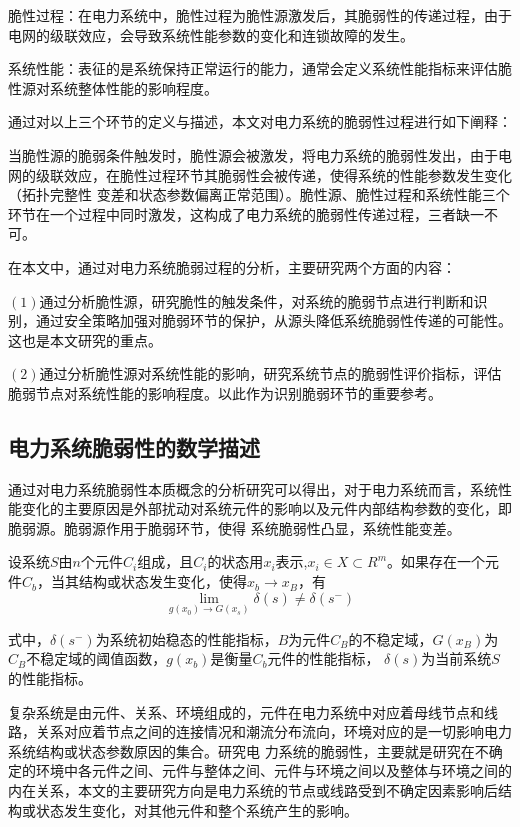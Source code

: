 脆性过程：在电力系统中，脆性过程为脆性源激发后，其脆弱性的传递过程，由于电网的级联效应，会导致系统性能参数的变化和连锁故障的发生。

系统性能：表征的是系统保持正常运行的能力，通常会定义系统性能指标来评估脆性源对系统整体性能的影响程度。

通过对以上三个环节的定义与描述，本文对电力系统的脆弱性过程进行如下阐释：

当脆性源的脆弱条件触发时，脆性源会被激发，将电力系统的脆弱性发出，由于电网的级联效应，在脆性过程环节其脆弱性会被传递，使得系统的性能参数发生变化（拓扑完整性
变差和状态参数偏离正常范围）。脆性源、脆性过程和系统性能三个环节在一个过程中同时激发，这构成了电力系统的脆弱性传递过程，三者缺一不可。

在本文中，通过对电力系统脆弱过程的分析，主要研究两个方面的内容：

$(1)$通过分析脆性源，研究脆性的触发条件，对系统的脆弱节点进行判断和识别，通过安全策略加强对脆弱环节的保护，从源头降低系统脆弱性传递的可能性。这也是本文研究的重点。

$(2)$通过分析脆性源对系统性能的影响，研究系统节点的脆弱性评价指标，评估脆弱节点对系统性能的影响程度。以此作为识别脆弱环节的重要参考。



\subsection{电力系统脆弱性的数学描述}
\label{sec:describtion}

通过对电力系统脆弱性本质概念的分析研究可以得出，对于电力系统而言，系统性能变化的主要原因是外部扰动对系统元件的影响以及元件内部结构参数的变化，即脆弱源。脆弱源作用于脆弱环节，使得
系统脆弱性凸显，系统性能变差。

设系统$S$由$n$个元件$C_i$组成，且$C_i$的状态用$x_i$表示,$x_i \in X \subset R^m$。如果存在一个元件$C_b$，当其结构或状态发生变化，使得$x_b \to x_B$，有
\begin{equation}
  \lim _{g\left(x_{0}\right) \rightarrow G\left(x_{s}\right)} \delta(s) \neq \delta\left(s^{-}\right)
  \end{equation}
 
式中，$\delta\left(s^{-}\right)$为系统初始稳态的性能指标，$B$为元件$C_B$的不稳定域，$G\left(x_{B}\right)$为$C_B$不稳定域的阈值函数，$g(x_b)$是衡量$C_b$元件的性能指标，
$\delta\left(s\right)$为当前系统$S$的性能指标。

复杂系统是由元件、关系、环境组成的，元件在电力系统中对应着母线节点和线路，关系对应着节点之间的连接情况和潮流分布流向，环境对应的是一切影响电力系统结构或状态参数原因的集合。研究电
力系统的脆弱性，主要就是研究在不确定的环境中各元件之间、元件与整体之间、元件与环境之间以及整体与环境之间的内在关系，本文的主要研究方向是电力系统的节点或线路受到不确定因素影响后结
构或状态发生变化，对其他元件和整个系统产生的影响。

